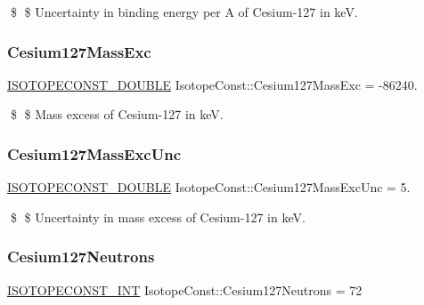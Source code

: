 \$ \$ Uncertainty in binding energy per A of Cesium-\/127 in keV. \mbox{\label{group___isotope_const-_cesium-_cs127_gafb3ad562540ea77801397bec52db2f63}} 
\subsubsection{\texorpdfstring{Cesium127\+Mass\+Exc}{Cesium127MassExc}}
{\footnotesize\ttfamily \mbox{\hyperlink{group___isotope_const-_macros_ga8f45a7272ce02c0b4c65c44636ed719a}{I\+S\+O\+T\+O\+P\+E\+C\+O\+N\+S\+T\+\_\+\+D\+O\+U\+B\+LE}} Isotope\+Const\+::\+Cesium127\+Mass\+Exc = -\/86240.}

\$ \$ Mass excess of Cesium-\/127 in keV. \mbox{\label{group___isotope_const-_cesium-_cs127_gaa0b949581b5fb9616fe7bf508978e81a}} 
\subsubsection{\texorpdfstring{Cesium127\+Mass\+Exc\+Unc}{Cesium127MassExcUnc}}
{\footnotesize\ttfamily \mbox{\hyperlink{group___isotope_const-_macros_ga8f45a7272ce02c0b4c65c44636ed719a}{I\+S\+O\+T\+O\+P\+E\+C\+O\+N\+S\+T\+\_\+\+D\+O\+U\+B\+LE}} Isotope\+Const\+::\+Cesium127\+Mass\+Exc\+Unc = 5.}

\$ \$ Uncertainty in mass excess of Cesium-\/127 in keV. \mbox{\label{group___isotope_const-_cesium-_cs127_ga3631e6fd66b6274a33374a38f7f09a25}} 
\subsubsection{\texorpdfstring{Cesium127\+Neutrons}{Cesium127Neutrons}}
{\footnotesize\ttfamily \mbox{\hyperlink{group___isotope_const-_macros_ga5f18360b3e99483a35c32d789e62621c}{I\+S\+O\+T\+O\+P\+E\+C\+O\+N\+S\+T\+\_\+\+I\+NT}} Isotope\+Const\+::\+Cesium127\+Neutrons = 72}

